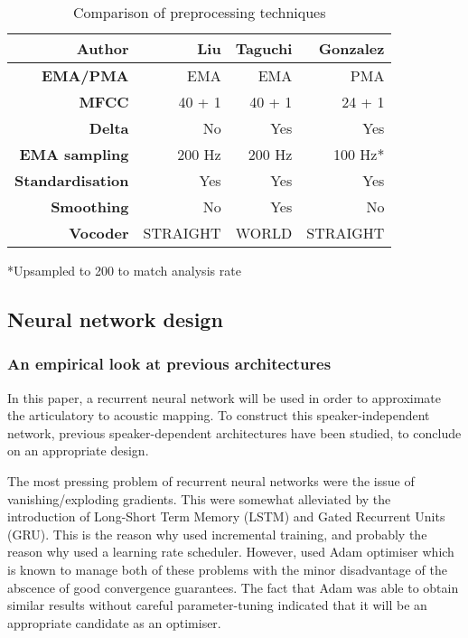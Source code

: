 \documentclass[a4paper]{article}
\begin{document}
\begin{table}[th]
  \caption{Comparison of preprocessing techniques}
  \label{tab:example}
  \centering
  \footnotesize
  \begin{tabular}{ r r r r }
    \toprule
    \textbf{Author} & \textbf{Liu} & \textbf{Taguchi} & \textbf{Gonzalez} \\
    \midrule
    \textbf{EMA/PMA} & EMA & EMA & PMA \\
    \textbf{MFCC} & 40 + 1 & 40 + 1 & 24 + 1 \\
    \textbf{Delta} & No & Yes & Yes \\
    \textbf{EMA sampling} & 200 Hz & 200 Hz & 100 Hz* \\
    \textbf{Standardisation} & Yes & Yes & Yes \\
    \textbf{Smoothing} & No & Yes  & No \\
    \textbf{Vocoder} & STRAIGHT \cite{Kawahara2006} & WORLD  & STRAIGHT \\
    \bottomrule
  \end{tabular}
  *Upsampled to 200 to match analysis rate
\end{table}

\subsection{Neural network design} \label{section:nnexperiment}

\subsubsection{An empirical look at previous architectures}

In this paper, a recurrent neural network will be used in order to
approximate the articulatory to acoustic mapping. To construct
this speaker-independent network, previous speaker-dependent architectures
have been studied, to conclude on an appropriate design.

The most pressing problem of recurrent neural networks were the issue
of vanishing/exploding gradients. This were somewhat alleviated by the
introduction of Long-Short Term Memory (LSTM) and Gated Recurrent Units (GRU).
This is the reason why \cite{Taguchi} used incremental
training, and probably the reason why \cite{Liu2018} used a learning rate
scheduler. However, \cite{Gonzalez2017} used Adam optimiser \cite{Kingma2015}
which is known to manage both of these problems with the minor disadvantage of
the abscence of good convergence guarantees. The fact that Adam was able
to obtain similar results without careful parameter-tuning indicated that
it will be an appropriate candidate as an optimiser. 
\end{document}
